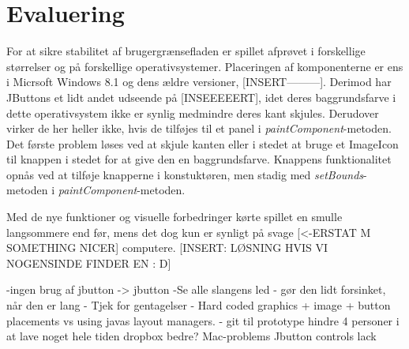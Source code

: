 
\section{Evaluering}
For at sikre stabilitet af brugergrænsefladen er spillet afprøvet i forskellige størrelser og på forskellige operativsystemer. Placeringen af komponenterne er ens i Micrsoft Windows 8.1 og dens ældre versioner, [INSERT---------]. Derimod har JButtons et lidt andet udseende på [INSEEEEERT], idet deres baggrundsfarve i dette operativsystem ikke er synlig medmindre deres kant skjules. Derudover virker de her heller ikke, hvis de tilføjes til et panel i \textit{paintComponent}-metoden. Det første problem løses ved at skjule kanten eller i stedet at bruge et ImageIcon til knappen i stedet for at give den en baggrundsfarve. Knappens funktionalitet opnås ved at tilføje knapperne i konstuktøren, men stadig med \textit{setBounds}-metoden i \textit{paintComponent}-metoden. 

Med de nye funktioner og visuelle forbedringer kørte spillet en smulle langsommere end før, mens det dog kun er synligt på svage [<-ERSTAT M SOMETHING NICER] computere. [INSERT: LØSNING HVIS VI NOGENSINDE FINDER EN : D]

-ingen brug af jbutton -> jbutton
-Se alle slangens led - gør den lidt forsinket, når den er lang
- Tjek for gentagelser
- Hard coded graphics + image + button placements    vs    using javas layout managers.
- git til prototype 
	hindre 4 personer i at lave noget hele tiden
	dropbox bedre?
Mac-problems
Jbutton
controls lack
